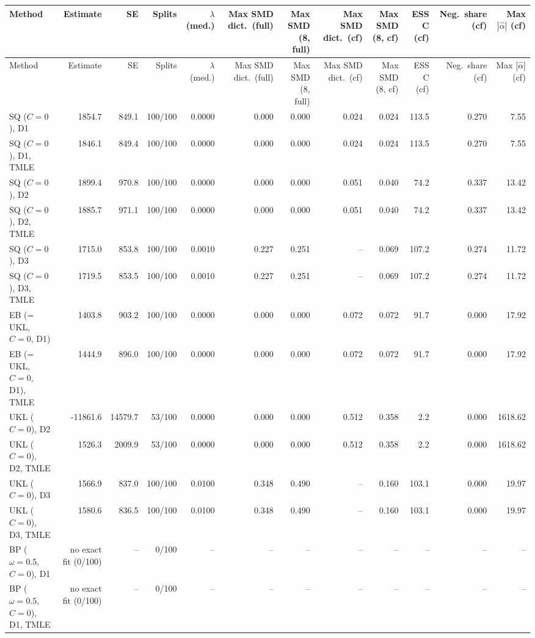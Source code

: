 \begin{tabular}{lrrrrrrrrrrr}
\hline
Method & Estimate & SE & Splits & $\lambda$ (med.) & Max SMD dict.\ (full) & Max SMD (8, full) & Max SMD dict.\ (cf) & Max SMD (8, cf) & ESS C (cf) & Neg.\ share (cf) & Max $|\widehat\alpha|$ (cf) \\
\hline
\endfirsthead
\hline
Method & Estimate & SE & Splits & $\lambda$ (med.) & Max SMD dict.\ (full) & Max SMD (8, full) & Max SMD dict.\ (cf) & Max SMD (8, cf) & ESS C (cf) & Neg.\ share (cf) & Max $|\widehat\alpha|$ (cf) \\
\hline
\endhead
SQ ($C=0$), D1 & 1854.7 & 849.1 & 100/100 & 0.0000 & 0.000 & 0.000 & 0.024 & 0.024 & 113.5 & 0.270 & 7.55 \\
SQ ($C=0$), D1, TMLE & 1846.1 & 849.4 & 100/100 & 0.0000 & 0.000 & 0.000 & 0.024 & 0.024 & 113.5 & 0.270 & 7.55 \\
SQ ($C=0$), D2 & 1899.4 & 970.8 & 100/100 & 0.0000 & 0.000 & 0.000 & 0.051 & 0.040 & 74.2 & 0.337 & 13.42 \\
SQ ($C=0$), D2, TMLE & 1885.7 & 971.1 & 100/100 & 0.0000 & 0.000 & 0.000 & 0.051 & 0.040 & 74.2 & 0.337 & 13.42 \\
SQ ($C=0$), D3 & 1715.0 & 853.8 & 100/100 & 0.0010 & 0.227 & 0.251 & -- & 0.069 & 107.2 & 0.274 & 11.72 \\
SQ ($C=0$), D3, TMLE & 1719.5 & 853.5 & 100/100 & 0.0010 & 0.227 & 0.251 & -- & 0.069 & 107.2 & 0.274 & 11.72 \\
EB (= UKL, $C=0$, D1) & 1403.8 & 903.2 & 100/100 & 0.0000 & 0.000 & 0.000 & 0.072 & 0.072 & 91.7 & 0.000 & 17.92 \\
EB (= UKL, $C=0$, D1), TMLE & 1444.9 & 896.0 & 100/100 & 0.0000 & 0.000 & 0.000 & 0.072 & 0.072 & 91.7 & 0.000 & 17.92 \\
UKL ($C=0$), D2 & -11861.6 & 14579.7 & 53/100 & 0.0000 & 0.000 & 0.000 & 0.512 & 0.358 & 2.2 & 0.000 & 1618.62 \\
UKL ($C=0$), D2, TMLE & 1526.3 & 2009.9 & 53/100 & 0.0000 & 0.000 & 0.000 & 0.512 & 0.358 & 2.2 & 0.000 & 1618.62 \\
UKL ($C=0$), D3 & 1566.9 & 837.0 & 100/100 & 0.0100 & 0.348 & 0.490 & -- & 0.160 & 103.1 & 0.000 & 19.97 \\
UKL ($C=0$), D3, TMLE & 1580.6 & 836.5 & 100/100 & 0.0100 & 0.348 & 0.490 & -- & 0.160 & 103.1 & 0.000 & 19.97 \\
BP ($\omega=0.5$, $C=0$), D1 & no exact fit (0/100) & -- & 0/100 & -- & -- & -- & -- & -- & -- & -- & -- \\
BP ($\omega=0.5$, $C=0$), D1, TMLE & no exact fit (0/100) & -- & 0/100 & -- & -- & -- & -- & -- & -- & -- & -- \\

\end{tabular}
